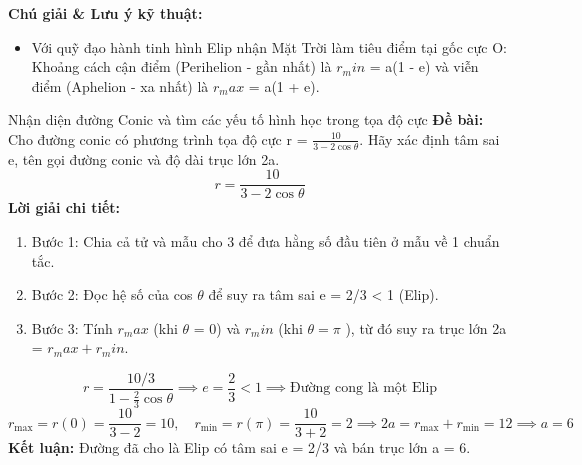 \documentclass[11pt,a4paper,oneside]{book}
\begin{document}
\noindent\textbf{Chú giải \& Lưu ý kỹ thuật:}
\begin{itemize}[leftmargin=1.5em, itemsep=2pt]
  \item Với quỹ đạo hành tinh hình Elip nhận Mặt Trời làm tiêu điểm tại gốc cực O: Khoảng cách cận điểm (Perihelion - gần nhất) là $r_min$ = a(1 - e) và viễn điểm (Aphelion - xa nhất) là $r_max$ = a(1 + e).
\end{itemize}

\begin{vidu}{Nhận diện đường Conic và tìm các yếu tố hình học trong tọa độ cực}
\textbf{Đề bài:} Cho đường conic có phương trình tọa độ cực r = $\frac{10}{3 - 2\cos\theta}$. Hãy xác định tâm sai e, tên gọi đường conic và độ dài trục lớn 2a.
\[ r = \frac{10}{3 - 2\cos\theta} \]
\textbf{Lời giải chi tiết:}
\begin{enumerate}[leftmargin=1.5em, itemsep=2pt]
  \item Bước 1: Chia cả tử và mẫu cho 3 để đưa hằng số đầu tiên ở mẫu về 1 chuẩn tắc.
  \item Bước 2: Đọc hệ số của cos $\theta$  để suy ra tâm sai e = 2/3 < 1 (Elip).
  \item Bước 3: Tính $r_max$ (khi $\theta$  = 0) và $r_min$ (khi $\theta = \pi$ ), từ đó suy ra trục lớn 2a = $r_max + r_min$.
\end{enumerate}
\[ r = \frac{10/3}{1 - \frac{2}{3}\cos\theta} \implies e = \frac{2}{3} < 1 \implies \text{Đường cong là một Elip} \]
\[ r_{\max} = r(0) = \frac{10}{3 - 2} = 10, \quad r_{\min} = r(\pi) = \frac{10}{3 + 2} = 2 \implies 2a = r_{\max} + r_{\min} = 12 \implies a = 6 \]
\noindent\textbf{Kết luận:} Đường đã cho là Elip có tâm sai e = 2/3 và bán trục lớn a = 6.
\end{vidu}
\end{document}
